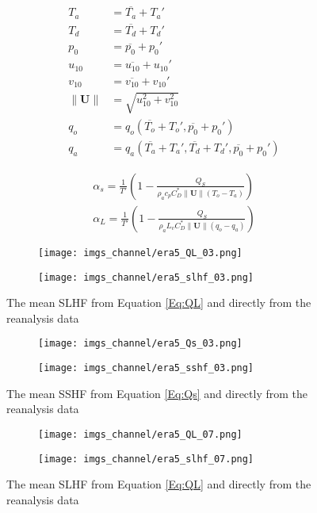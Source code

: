 \documentclass[12pt,a4paper]{article}
\newcommand{\Vmag}[1]{\| \mathbf{#1}\|}
\begin{document}
\begin{align}
T_a &=\overline{T_a} + T_a' \\
T_d &=\overline{T_d} + T_d' \\
p_0 &=\overline{p_0} + p_0' \\
u_{10} &= \overline{u_{10}} + u_{10}' \\
v_{10} &= \overline{v_{10}} + v_{10}'\\
\Vmag{U} &= \sqrt{u_{10}^2 + v_{10}^2}\\
q_o &= q_o(\overline{T_o}+T_o',\overline{p_0}+p_0')\\
q_a &= q_a(\overline{T_a}+T_a',\overline{T_d}+T_d',\overline{p_0}+p_0')
\end{align}

\begin{align}
\alpha_s = \frac{1}{T'}\left( 1-\frac{Q_S}{\rho_a c_p C_D^* \Vmag{U} (T_o-T_a)} \right)\\
\alpha_L = \frac{1}{T'}\left( 1-\frac{Q_S}{\rho_a L_v C_D^* \Vmag{U} (q_o-q_a)} \right)
\end{align}

\begin{figure}[h!]
\centering
\begin{subfigure}[t]{0.49\textwidth}
\texttt{[image: imgs\_channel/era5\_QL\_03.png]}
\end{subfigure}
\begin{subfigure}[t]{0.49\textwidth}
\texttt{[image: imgs\_channel/era5\_slhf\_03.png]}
\end{subfigure}
\caption{The mean SLHF from Equation \ref{Eq:QL} and directly from the reanalysis data}
\end{figure}

\begin{figure}[h!]
\centering
\begin{subfigure}[t]{0.49\textwidth}
\texttt{[image: imgs\_channel/era5\_Qs\_03.png]}
\end{subfigure}
\begin{subfigure}[t]{0.49\textwidth}
\texttt{[image: imgs\_channel/era5\_sshf\_03.png]}
\end{subfigure}
\caption{The mean SSHF from Equation \ref{Eq:Qs} and directly from the reanalysis data}
\end{figure}

\begin{figure}[h!]
\centering
\begin{subfigure}[t]{0.49\textwidth}
\texttt{[image: imgs\_channel/era5\_QL\_07.png]}
\end{subfigure}
\begin{subfigure}[t]{0.49\textwidth}
\texttt{[image: imgs\_channel/era5\_slhf\_07.png]}
\end{subfigure}
\caption{The mean SLHF from Equation \ref{Eq:QL} and directly from the reanalysis data}
\end{figure}
\end{document}
